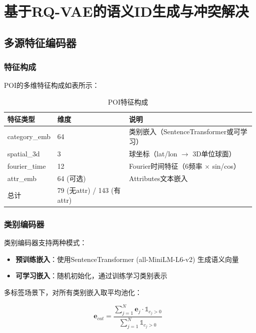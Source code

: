 \chapter{基于RQ-VAE的语义ID生成与冲突解决}
\label{chap:rqvae_sid}

\section{多源特征编码器}
\label{sec:feature_encoder}

\subsection{特征构成}
\label{sec:feature构成}

POI的多维特征构成如表所示：

\begin{table}[htbp]
\centering
\caption{POI特征构成}
\label{tab:poi_features}
\begin{tabular}{lll}
\toprule
特征类型 & 维度 & 说明 \\
\midrule
category\_emb & 64 & 类别嵌入（SentenceTransformer或可学习） \\
spatial\_3d & 3 & 球坐标（lat/lon $\rightarrow$ 3D单位球面） \\
fourier\_time & 12 & Fourier时间特征（6频率 $\times$ sin/cos） \\
attr\_emb & 64 (可选) & Attributes文本嵌入 \\
\midrule
总计 & 79 (无attr) / 143 (有attr) & \\
\bottomrule
\end{tabular}
\end{table}

\subsection{类别编码器}
\label{sec:category_encoder}

类别编码器支持两种模式：
\begin{itemize}
    \item \textbf{预训练嵌入}：使用SentenceTransformer (all-MiniLM-L6-v2) 生成语义向量
    \item \textbf{可学习嵌入}：随机初始化，通过训练学习类别表示
\end{itemize}

多标签场景下，对所有类别嵌入取平均池化：

\begin{equation}
\mathbf{e}_{cat} = \frac{\sum_{j=1}^{N} \mathbf{e}_j \cdot \mathbb{1}_{c_j > 0}}{\sum_{j=1}^{N} \mathbb{1}_{c_j > 0}}
\label{eq:category_pooling}
\end{equation}

